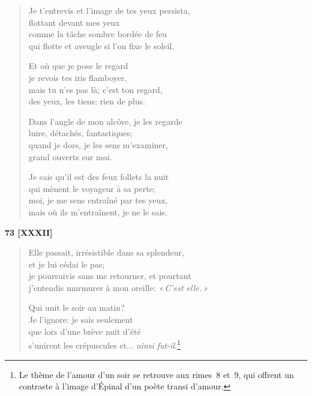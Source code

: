 \begin{verse}
  Je t'entrevis et l'image de tes yeux persista, \\
  flottant devant mes yeux \\
  comme la tâche sombre bordée de feu \\
  qui flotte et aveugle si l'on fixe le soleil.

  Et où que je pose le regard \\
  je revois tes iris flamboyer, \\
  mais tu n'es pas là; c'est ton regard, \\
  des yeux, les tiens; rien de plus.

  Dans l'angle de mon alcôve, je les regarde \\
  luire, détachés, fantastiques; \\
  quand je dors, je les sens m'examiner, \\
  grand ouverts sur moi.

  Je sais qu'il est des feux follets la nuit \\
  qui mènent le voyageur à sa perte; \\
  moi, je me sens entraîné par tes yeux, \\
  mais où ils m'entraînent, je ne le sais.
\end{verse}


\begin{center}
  \textbf{73 [XXXII]}
\end{center}

\begin{verse}
  Elle passait, irrésistible dans sa splendeur, \\
  et je lui cédai le pas; \\
  je poursuivis sans me retourner, et pourtant \\
  j'entendis murmurer à mon oreille: \emph{«\,C'est elle.\,»}

  Qui unit le soir au matin? \\
  Je l'ignore: je sais seulement \\
  que lors d'une brève nuit d'été \\
  s'unirent les crépuscules et... \emph{ainsi fut-il}.\footnote{Le
  thème de l'amour d'un soir se retrouve aux rimes~8 et~9, qui offrent
  un contraste à l'image d'Épinal d'un poète transi d'amour.}
\end{verse}



